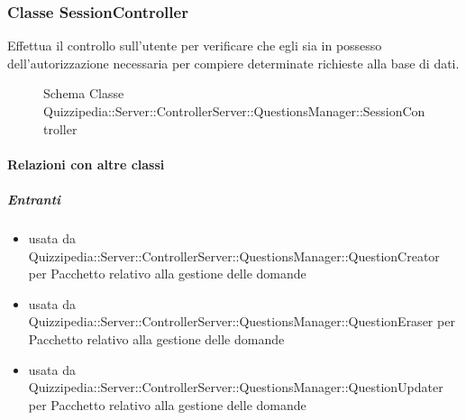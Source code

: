 \subsubsection{Classe SessionController}
Effettua il controllo sull'utente per verificare che egli sia in possesso dell'autorizzazione necessaria per compiere determinate richieste alla base di dati.
\begin{figure}[H]
\centering
\noindent{}
\caption[Schema Classe SessionController]{Schema Classe Quizzipedia::Server::ControllerServer::QuestionsManager::SessionController}
\end{figure}
\paragraph{Relazioni con altre classi}
\subparagraph{Entranti}
\begin{itemize}
\item usata da Quizzipedia::Server::ControllerServer::QuestionsManager::QuestionCreator per Pacchetto relativo alla gestione delle domande
\item usata da Quizzipedia::Server::ControllerServer::QuestionsManager::QuestionEraser per Pacchetto relativo alla gestione delle domande
\item usata da Quizzipedia::Server::ControllerServer::QuestionsManager::QuestionUpdater per Pacchetto relativo alla gestione delle domande
\end{itemize}
